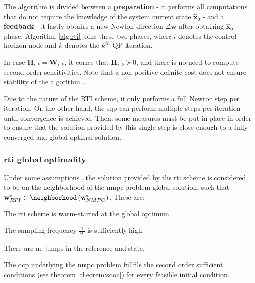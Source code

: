 The algorithm is divided between a \textbf{preparation} - it performs all computations that do not require the knowledge of the system current state $\mathbf{\hat{x}}_0$ - and a \textbf{feedback} - it fastly obtains a new Newton direction $\Delta \mathbf{w}$ after obtaining $\mathbf{\hat{x}}_0$ - phase. Algorithm \ref{alg:rti} joins these two phases, where $i$ denotes the control horizon node and $k$ denotes the $k^{th}$ QP iteration.

\begin{remark}
In case $\mathbf{H}_{i, k} = \mathbf{W}_{i, k}$, it comes that $\mathbf{H}_{i, k} \succeq 0$, and there is no need to compute second-order sensitivities. Note that a non-positive definite cost does not ensure stability of the algorithm \cite{gros2020linear}.
\end{remark}

Due to the nature of the RTI scheme, it only performs a full Newton step per iteration. On the other hand, the \acrshort{sqp} can perform multiple steps per iteration until convergence is achieved. Then, some measures must be put in place in order to ensure that the solution provided by this single step is close enough to a fully converged and global optimal solution. 

\subsubsection*{\acrshort{rti} global optimality}

Under some assumptions \cite{gros2020linear}, the solution provided by the \acrshort{rti} scheme is considered to be on the neighborhood of the \acrshort{nmpc} problem global solution, such that $\mathbf{w}_{RTI}^* \in \neighborhood\left( \mathbf{w}_{NMPC}^* \right)$. These are:

\begin{assumption}\label{assumption:rti1}
The \acrshort{rti} scheme is warm-started at the global optimum.
\end{assumption}

\begin{assumption}\label{assumption:rti2}
The sampling frequency $\frac{1}{\delta t_i}$ is sufficiently high.
\end{assumption}

\begin{assumption}\label{assumption:rti3}
There are no jumps in the reference and state.
\end{assumption}

\begin{assumption}\label{assumption:rti4}
The \acrshort{ocp} underlying the \acrshort{nmpc} problem fullfils the second order sufficient conditions (see theorem \ref{theorem:sooc}) for every feasible initial condition.
\end{assumption}

